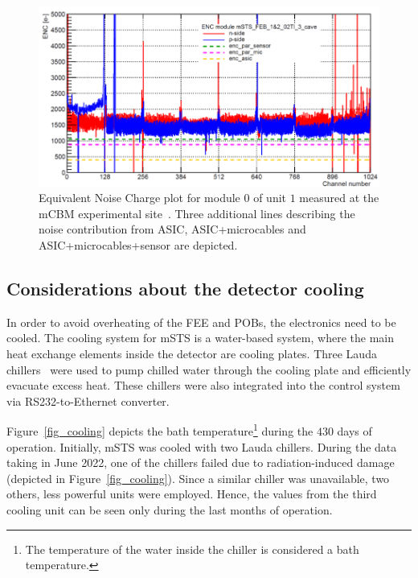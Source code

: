 \begin{figure}[!h]
\centering
\includegraphics[width=0.9\columnwidth]{Chapter6/DCS/images/U1M1_ENC.png}
\caption{Equivalent Noise Charge plot for module $0$ of unit $1$ measured at the \gls{mCBM} experimental site~\cite{Adrian}. Three additional lines describing the noise contribution from ASIC, ASIC+microcables and ASIC+microcables+sensor are depicted.}
\label{fig_msts_ENC2}
\end{figure}


\subsection{Considerations about the detector cooling}
\label{msts_cooling}
In order to avoid overheating of the \gls{FEE} and \glspl{POB}, the electronics need to be cooled. The cooling system for \gls{mSTS} is a water-based  system, where the main heat exchange elements inside the detector are cooling plates. Three Lauda chillers~\cite{Lauda1} were used to pump chilled water through the cooling plate and efficiently evacuate excess heat. These chillers were also integrated into the control system via RS232-to-Ethernet converter.

Figure~\ref{fig_cooling} depicts the bath temperature\footnote{The temperature of the water inside the chiller is considered a bath temperature.} during the $430$ days of operation. Initially, \gls{mSTS} was cooled with two Lauda chillers. During the data taking in June 2022, one of the chillers failed due to radiation-induced damage (depicted in Figure~\ref{fig_cooling}). Since a similar chiller was unavailable, two others, less powerful units were employed. Hence, the values from the third cooling unit can be seen only during the last months of operation. 

